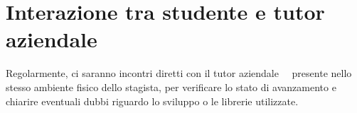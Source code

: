 \section*{Interazione tra studente e tutor aziendale}

Regolarmente, ci saranno incontri diretti con il tutor aziendale \nomeTutorAziendale\ \cognomeTutorAziendale\, presente nello stesso ambiente fisico dello stagista, per verificare lo stato di avanzamento e chiarire eventuali dubbi riguardo lo sviluppo o le librerie utilizzate.